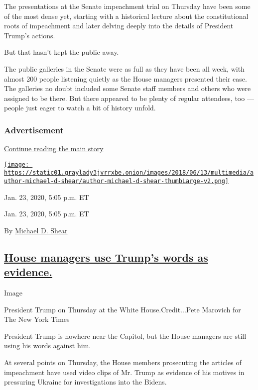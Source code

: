 The presentations at the Senate impeachment trial on Thursday have been
some of the most dense yet, starting with a historical lecture about the
constitutional roots of impeachment and later delving deeply into the
details of President Trump's actions.

But that hasn't kept the public away.

The public galleries in the Senate were as full as they have been all
week, with almost 200 people listening quietly as the House managers
presented their case. The galleries no doubt included some Senate staff
members and others who were assigned to be there. But there appeared to
be plenty of regular attendees, too --- people just eager to watch a bit
of history unfold.

\hypertarget{advertisement-3}{%
\subsubsection{Advertisement}\label{advertisement-3}}

\protect\hyperlink{after-dfp-ad-mid4}{Continue reading the main story}

\href{https://www.nytimes3xbfgragh.onion/by/michael-d-shear}{\texttt{[image: https://static01.graylady3jvrrxbe.onion/images/2018/06/13/multimedia/author-michael-d-shear/author-michael-d-shear-thumbLarge-v2.png]}}

Jan. 23, 2020, 5:05 p.m. ET

Jan. 23, 2020, 5:05 p.m. ET

By \href{https://www.nytimes3xbfgragh.onion/by/michael-d-shear}{Michael
D. Shear}

\hypertarget{house-managers-use-trumps-words-as-evidence}{%
\subsection{\texorpdfstring{\protect\hyperlink{house-managers-trump-evidence}{House
managers use Trump's words as
evidence.}}{House managers use Trump's words as evidence.}}\label{house-managers-use-trumps-words-as-evidence}}

Image

President Trump on Thursday at the White House.Credit...Pete Marovich
for The New York Times

President Trump is nowhere near the Capitol, but the House managers are
still using his words against him.

At several points on Thursday, the House members prosecuting the
articles of impeachment have used video clips of Mr. Trump as evidence
of his motives in pressuring Ukraine for investigations into the Bidens.

